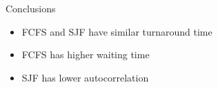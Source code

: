 \documentclass[aspectratio=169,xcolor=dvipsnames]{beamer}
\begin{document}

\begin{frame}{Conclusions}
    \begin{itemize}
        \item FCFS and SJF have similar turnaround time
        \item FCFS has higher waiting time
        \item SJF has lower autocorrelation
    \end{itemize}
\end{frame}

\end{document}
